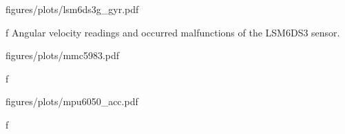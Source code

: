 \midinsert
    \hsize \cinspic figures/plots/lsm6ds3g_gyr.pdf
    \caption/f Angular velocity readings and occurred malfunctions of the LSM6DS3 sensor.
\endinsert



\midinsert
    \hsize \cinspic figures/plots/mmc5983.pdf
    \caption/f 
\endinsert

\midinsert
    \hsize \cinspic figures/plots/mpu6050_acc.pdf
    \caption/f 
\endinsert